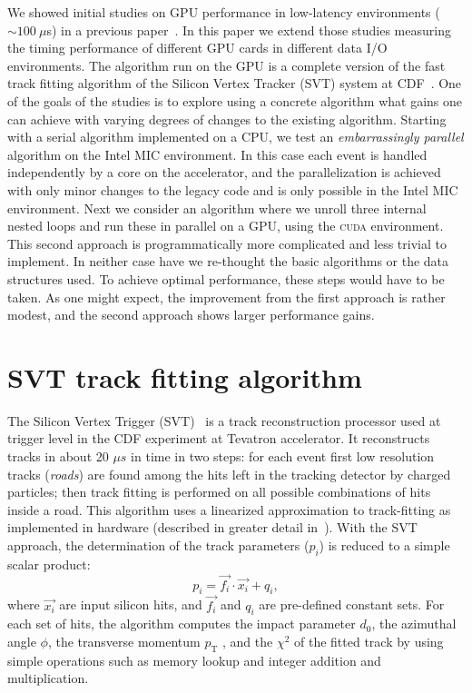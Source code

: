 \documentclass[a4]{jpconf}
\begin{document}
We showed initial studies on GPU performance in low-latency
environments ($\sim 100~\mu$s) in a previous
paper~\cite{TIPP2011,NSS2012}.  In this paper we extend those studies
measuring the timing performance of different GPU cards in different
data I/O environments. The algorithm run on the GPU is a complete
version of the fast track fitting algorithm of the Silicon Vertex
Tracker (SVT) system at CDF~\cite{SVT1}.
One of the goals of the studies is to explore using a concrete
algorithm what gains one can achieve with varying degrees of changes
to the existing algorithm. Starting with a serial algorithm
implemented on a CPU, we test an \textit{embarrassingly parallel}
algorithm on the Intel MIC environment. In this case each event is
handled independently by a core on the accelerator, and the
parallelization is achieved with only minor changes to the legacy code
and is only possible in the Intel MIC environment. Next we consider an
algorithm where we unroll three internal nested loops and run these in
parallel on a GPU, using the \textsc{cuda} environment. This second
approach is programmatically more complicated and less trivial to
implement. In neither case have we re-thought the basic algorithms or
the data structures used. To achieve optimal performance, these steps
would have to be taken.  As one might expect, the improvement from the
first approach is rather modest, and the second approach shows larger
performance gains.

\section{SVT track fitting algorithm}
The Silicon Vertex Trigger (SVT)~\cite{SVT1,SVT2} is a 
track reconstruction processor used at 
trigger level in the CDF experiment at Tevatron accelerator. It reconstructs 
tracks in about 20 $\mu s$ in time in two steps: for each event 
first low resolution tracks (\textit{roads}) are found among the hits left 
in the tracking detector by charged particles; then track fitting is 
performed on all possible combinations of hits inside a road. 
This algorithm uses a linearized approximation to track-fitting as 
implemented in hardware (described in greater detail in~\cite{SVT3}). 
With the SVT approach, the determination of the track parameters 
($p_i$) is reduced to a simple scalar product:
\[
p_i = \vec{f_i} \cdot \vec{x_i} + q_i,
\]
where $\vec{x_i}$ are input silicon hits, and $\vec{f_i}$ and $q_i$ are 
pre-defined constant sets. For each set of hits, the algorithm
computes the impact parameter $d_0$, the azimuthal angle $\phi$, 
the transverse momentum $p_\mathrm{T}$ , and the $\chi^2$ of the
fitted track by using simple operations such as memory lookup and 
integer addition and multiplication.
\end{document}
